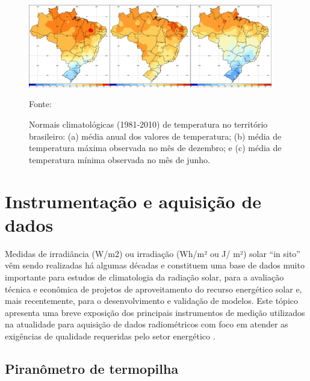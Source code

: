 \begin{figure}[H]
    \centering
    \includegraphics[width=0.95\textwidth]{./Figuras/temperatura_clima.png}
    \caption{ Normais climatológicas (1981‐2010) de temperatura no território brasileiro: (a) média anual dos valores de temperatura; (b) média de temperatura máxima observada no mês de dezembro; e (c) média de temperatura mínima observada no mês de junho.}{Fonte: \cite{INMET}}
   \label{fig:temperatura_clima}
\end{figure}



\section{Instrumentação e aquisição de dados}

Medidas de irradiância (W/m2) ou irradiação (Wh/m² ou J/ m²) solar “in sito” vêm sendo realizadas há algumas décadas e constituem uma base de dados muito importante para estudos de climatologia da radiação solar, para a avaliação técnica e econômica de projetos de aproveitamento do recurso energético solar e, mais recentemente, para o desenvolvimento e validação de modelos. Este tópico apresenta uma breve exposição dos principais instrumentos de medição utilizados na atualidade para aquisição de dados radiométricos com foco em atender as exigências de qualidade requeridas pelo setor energético \cite{atlas2017}.

\subsection{Piranômetro de termopilha}

